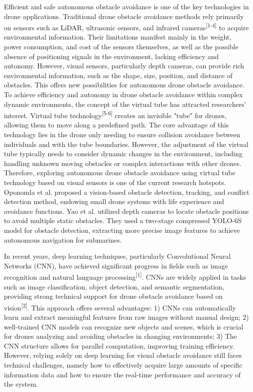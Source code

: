 \documentclass[preprint,12pt,authoryear]{elsarticle}
\begin{document}
Efficient and safe autonomous obstacle avoidance is one of the key technologies in drone applications. Traditional drone obstacle avoidance methods rely primarily on sensors such as LiDAR, ultrasonic sensors, and infrared cameras\textsuperscript{[1-4]} to acquire environmental information. Their limitations manifest mainly in the weight, power consumption, and cost of the sensors themselves, as well as the possible absence of positioning signals in the environment, lacking efficiency and autonomy. However, visual sensors, particularly depth cameras, can provide rich environmental information, such as the shape, size, position, and distance of obstacles. This offers new possibilities for autonomous drone obstacle avoidance. To achieve efficiency and autonomy in drone obstacle avoidance within complex dynamic environments, the concept of the virtual tube has attracted researchers' interest. Virtual tube technology\textsuperscript{[5-6]} creates an invisible "tube" for drones, allowing them to move along a predefined path. The core advantage of this technology lies in the drone only needing to ensure collision avoidance between individuals and with the tube boundaries. However, the adjustment of the virtual tube typically needs to consider dynamic changes in the environment, including handling unknown moving obstacles or complex interactions with other drones. Therefore, exploring autonomous drone obstacle avoidance using virtual tube technology based on visual sensors is one of the current research hotspots. Oponomla et al. proposed a vision-based obstacle detection, tracking, and conflict detection method, endowing small drone systems with life experience and avoidance functions. Yao et al. utilized depth cameras to locate obstacle positions to avoid multiple static obstacles. They used a two-stage compressed YOLO-6S model for obstacle detection, extracting more precise image features to achieve autonomous navigation for submarines.

In recent years, deep learning techniques, particularly Convolutional Neural Networks (CNN), have achieved significant progress in fields such as image recognition and natural language processing\textsuperscript{[1]}. CNNs are widely applied in tasks such as image classification, object detection, and semantic segmentation, providing strong technical support for drone obstacle avoidance based on vision\textsuperscript{[2]}. This approach offers several advantages: 1) CNNs can automatically learn and extract meaningful features from raw images without manual design; 2) well-trained CNN models can recognize new objects and scenes, which is crucial for drones analyzing and avoiding obstacles in changing environments; 3) The CNN structure allows for parallel computation, improving training efficiency. However, relying solely on deep learning for visual obstacle avoidance still faces technical challenges, namely how to effectively acquire large amounts of specific information data and how to ensure the real-time performance and accuracy of the system.
\end{document}
